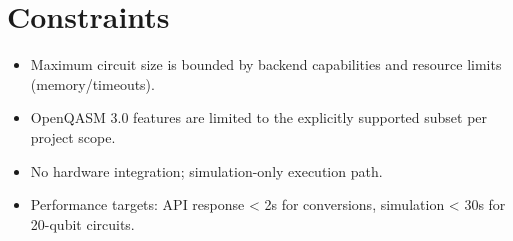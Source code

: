 \section{Constraints}

\begin{itemize}
    \item Maximum circuit size is bounded by backend capabilities and resource limits (memory/timeouts).
    \item OpenQASM 3.0 features are limited to the explicitly supported subset per project scope.
    \item No hardware integration; simulation-only execution path.
    \item Performance targets: API response < 2s for conversions, simulation < 30s for 20-qubit circuits.
\end{itemize}
